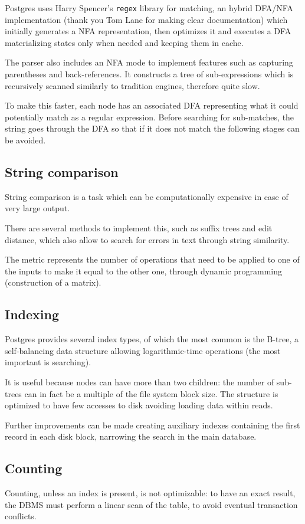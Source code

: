 Postgres uses Harry Spencer's \texttt{regex} library for matching, an hybrid DFA/NFA implementation (thank you Tom Lane for making clear documentation) which initially generates a NFA representation, then optimizes it and executes a DFA materializing states only when needed and keeping them in cache. 

The parser also includes an NFA mode to implement features such as capturing parentheses and back-references. It constructs a tree of sub-expressions which is recursively scanned similarly to tradition engines, therefore quite slow. 

To make this faster, each node has an associated DFA representing what it could potentially match as a regular expression. Before searching for sub-matches, the string goes through the DFA so that if it does not match the following stages can be avoided.

\subsection{String comparison}
String comparison is a task which can be computationally expensive in case of very large output. 

There are several methods to implement this, such as suffix trees and edit distance, which also allow to search for errors in text through string similarity. 

The metric represents the number of operations that need to be applied to one of the inputs to make it equal to the other one, through dynamic programming (construction of a matrix). 

\subsection{Indexing}
Postgres provides several index types, of which the most common is the B-tree, a self-balancing data structure allowing logarithmic-time operations (the most important is searching).

It is useful because nodes can have more than two children: the number of sub-trees can in fact be a multiple of the file system block size. The structure is optimized to have few accesses to disk avoiding loading data within reads.

Further improvements can be made creating auxiliary indexes containing the first record in each disk block, narrowing the search in the main database.

\subsection{Counting}
Counting, unless an index is present, is not optimizable: to have an exact result, the DBMS must perform a linear scan of the table, to avoid eventual transaction conflicts.

